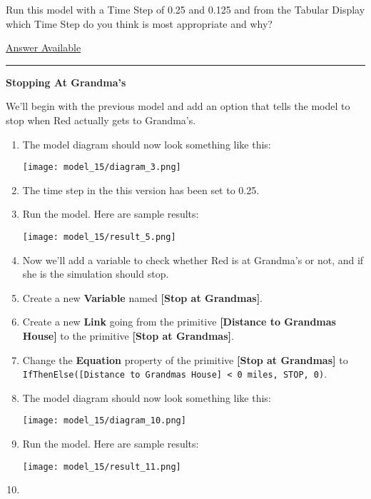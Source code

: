 \documentclass[]{memoir}
\makeatletter
\def\maxwidth{\ifdim\Gin@nat@width>\linewidth\linewidth
\else\Gin@nat@width\fi}
\let\Oldincludegraphics\includegraphics
\renewcommand{\includegraphics}[1]{\Oldincludegraphics[width=\maxwidth]{#1}}
\newcommand{\p}[1]{\textbf{{[}#1{]}}}
\newcommand{\e}[1]{\texttt{#1}}
\renewcommand{\a}[1]{\textbf{#1}}
\makeatother
\begin{document}

Run this model with a Time Step of 0.25 and 0.125 and from the Tabular
Display which Time Step do you think is most appropriate and why?

\hyperref[Ans-4-1]{Answer Available}

\begin{center}\rule{3in}{0.4pt}\end{center}

\FloatBarrier 

\begin{oframed}\textbf{Stopping At Grandma's} 

 We'll begin with the previous model and add an option that tells the model to stop when Red actually gets to Grandma's.

\begin{enumerate}
\item The model diagram should now look something like this: \par \begin{minipage}{\linewidth}  \centering \texttt{[image: model\_15/diagram\_3.png]}
\end{minipage}
\item 

The time step in the this version has been set to 0.25.


\item Run the model. Here are sample results:\par \begin{minipage}{\linewidth}  \centering \texttt{[image: model\_15/result\_5.png]}
\end{minipage}
\item 

Now we'll add a variable to check whether Red is at Grandma's or not, and if she is the simulation should stop.


\item Create a new \a{Variable} named \p{Stop at Grandmas}.
\item Create a new \a{Link} going from the primitive \p{Distance to Grandmas House} to the primitive \p{Stop at Grandmas}.
\item  Change the \a{Equation} property of the primitive \p{Stop at Grandmas} to \e{IfThenElse([Distance to Grandmas House] < {0 miles}, STOP, 0)}.
\item The model diagram should now look something like this: \par \begin{minipage}{\linewidth}  \centering \texttt{[image: model\_15/diagram\_10.png]}
\end{minipage}
\item Run the model. Here are sample results:\par \begin{minipage}{\linewidth}  \centering \texttt{[image: model\_15/result\_11.png]}
\end{minipage}
\item 


\end{enumerate}
\end{oframed}
\end{document}
